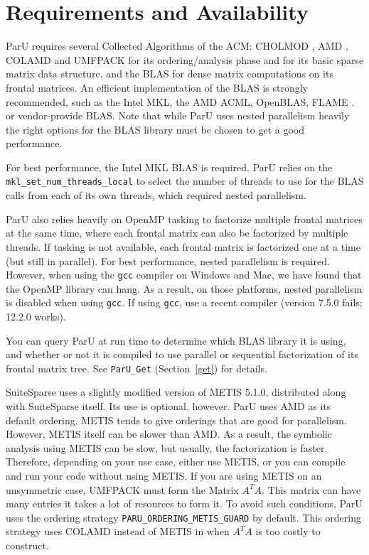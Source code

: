 \documentclass[12pt]{article}
\begin{document}
\section{Requirements and Availability}
\label{summary}

ParU requires several Collected Algorithms of the ACM:
CHOLMOD \cite{ChenDavisHagerRajamanickam09,DavisHager09},
AMD \cite{AmestoyDavisDuff96,AmestoyDavisDuff03},
COLAMD \cite{DavisGilbertLarimoreNg00_algo,DavisGilbertLarimoreNg00}
and UMFPACK \cite{10.1145/992200.992206} for its ordering/analysis phase and
for its basic sparse matrix data structure, and the BLAS \cite{dddh:90} for
dense matrix computations on its frontal matrices.  An efficient implementation
of the BLAS is strongly recommended, such as the Intel MKL, the AMD ACML,
OpenBLAS, FLAME \cite{GotoVanDeGeijn08}. or vendor-provide BLAS. Note that
while ParU uses nested parallelism heavily the right options for the BLAS
library must be chosen to get a good performance.

For best performance, the Intel MKL BLAS is required.  ParU relies on the
\verb'mkl_set_num_threads_local' to select the number of threads to use
for the BLAS calls from each of its own threads, which required nested
parallelism.

ParU also relies heavily on OpenMP tasking to factorize multiple frontal
matrices at the same time, where each frontal matrix can also be factorized by
multiple threads.  If tasking is not available, each frontal matrix is
factorized one at a time (but still in parallel).  For best performance, nested
parallelism is required.  However, when using the \verb'gcc' compiler on
Windows and Mac, we have found that the OpenMP library can hang.  As a result,
on those platforms, nested parallelism is disabled when using \verb'gcc'.
If using \verb'gcc', use a recent compiler (version 7.5.0 fails; 12.2.0
works).

You can query ParU at run time to determine which BLAS library it is using, and
whether or not it is compiled to use parallel or sequential factorization of
its frontal matrix tree.  See \verb'ParU_Get' (Section~\ref{get}) for details.

SuiteSparse uses a slightly modified version of METIS 5.1.0, distributed along
with SuiteSparse itself.  Its use is optional, however. ParU uses AMD as its
default ordering. METIS tends to give orderings that are good for parallelism.
However, METIS itself can be slower than AMD. As a result, the symbolic
analysis using METIS can be slow, but usually, the factorization is faster.
Therefore, depending on your use case, either use METIS, or you can compile and
run your code without using METIS.  If you are using METIS on an unsymmetric
case, UMFPACK must form the Matrix $A^{T}A$. This matrix can have many entries
it takes a lot of resources to form it. To avoid such conditions, ParU uses the
ordering strategy \verb'PARU_ORDERING_METIS_GUARD' by default.  This
ordering strategy uses COLAMD instead of METIS in when $A^T A$ is too costly to
construct.
\end{document}
